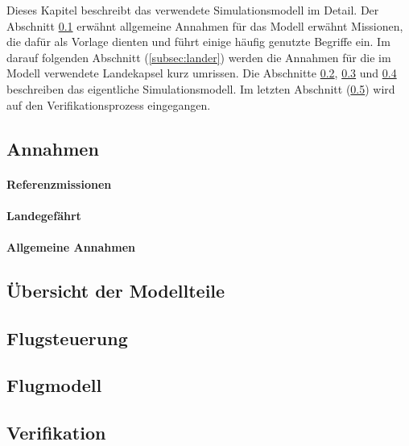 Dieses Kapitel beschreibt das verwendete Simulationsmodell im Detail. Der Abschnitt \ref{subsec:assumptions} erwähnt allgemeine Annahmen für das Modell  erwähnt Missionen, die dafür als Vorlage dienten und führt einige häufig genutzte Begriffe ein. Im darauf folgenden Abschnitt (\ref{subsec:lander}) werden die Annahmen für die im Modell verwendete Landekapsel kurz umrissen. Die Abschnitte \ref*{subsec:modelParts}, \ref*{subsec:controller} und \ref*{subsec:model} beschreiben das eigentliche Simulationsmodell. Im letzten Abschnitt (\ref{subsec:verification}) wird auf den Verifikationsprozess eingegangen.

\subsection{Annahmen}
\label{subsec:assumptions}
\paragraph{Referenzmissionen}


\paragraph{Landegefährt}


\paragraph{Allgemeine Annahmen}


\subsection{Übersicht der Modellteile}
\label{subsec:modelParts}

	
\subsection{Flugsteuerung}
\label{subsec:controller}

	
\subsection{Flugmodell}
\label{subsec:model}


\subsection{Verifikation}
\label{subsec:verification}
